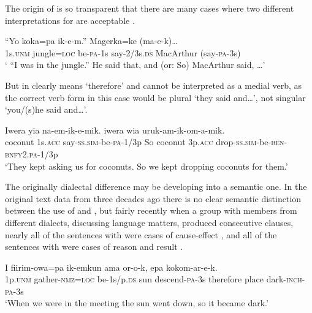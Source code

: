 The origin of  is so transparent that there are many cases where two different interpretations for  are acceptable . 

\ea%
\label{ex:3:x734}
\gll ``Yo koka=pa ik-e-m.''  Magerka=ke (ma-e-k){\dots} \\
1s.\textsc{unm} jungle=\textsc{loc} be-\textsc{pa}-1s say-2/3s.\textsc{ds} MacArthur (say-\textsc{pa}-3s)\\
\glt` ``I was in the jungle.'' He said that, and (or: So) MacArthur said, {\dots}'
\z

But in   clearly means `therefore' and cannot be interpreted as a medial verb, as the correct verb form in this case would be plural  `they said and{\dots}', not singular  `you/(s)he said and{\dots}'.

\ea%
\label{ex:3:x733}
\gll Iwera yia na-em-ik-e-mik.  iwera wia uruk-am-ik-om-a-mik.\\
coconut 1s.\textsc{acc} say-\textsc{ss}.\textsc{sim}-be-\textsc{pa}-1/3p So coconut 3p.\textsc{acc} drop-\textsc{ss}.\textsc{sim}-be-\textsc{ben}-\textsc{bnfy}2.\textsc{pa}-1/3p\\
\glt`They kept asking us for coconuts. So we kept dropping coconuts for them.'
\z

The originally dialectal difference may be developing into a semantic one. In the original text data from three decades ago there is no clear semantic distinction between the use of  and , but fairly recently when a group with members from different dialects, discussing language matters, produced consecutive clauses, nearly all of the sentences with  were cases of cause-effect , and all of the sentences with  were cases of reason and result . 

\ea%
\label{ex:3:x1414}
\gll I fiirim-owa=pa ik-emkun ama or-o-k,  epa kokom-ar-e-k.\\
1p.\textsc{unm} gather-\textsc{nmz}=\textsc{loc} be-1s/p.\textsc{ds} sun descend-\textsc{pa}-3s therefore place dark-\textsc{inch}-\textsc{pa}-3s\\
\glt`When we were in the meeting the sun went down, so it became dark.'
\z

